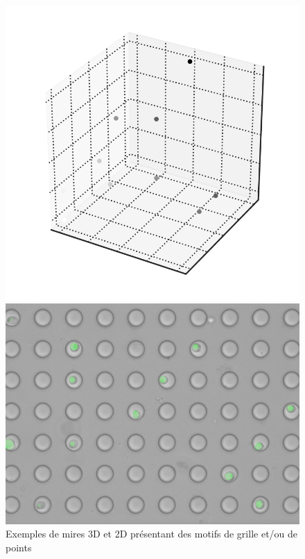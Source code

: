 \begin{itemize}[label={\Huge$\star$}]
\begin{figure}[h]
{\begin{minipage}{0.23\textwidth}
  	\end{minipage}\hfill
  	\begin{minipage}{0.23\textwidth}
  		\centering
  		\includegraphics[width=\linewidth]{images/mire3}
  	\end{minipage}\hfill
  	\begin{minipage}{0.23\textwidth}
  		\centering
  		\includegraphics[width=\linewidth]{images/mire4}
  	\end{minipage}
  }
  \caption[Exemples de mires]{ Exemples de mires 3D et 2D présentant des motifs de grille et/ou de points}
  \label{fig:Exemples de mires}
  \end{figure}
  

\end{itemize}
